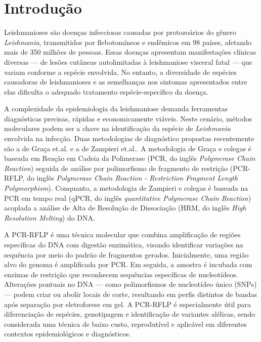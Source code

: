 \section{Introdução}

Leishmanioses são doenças infecciosas causadas por protozoários do gênero
\textit{Leishmania}, transmitidos por flebotomíneos e endêmicos em 98 países,
afetando mais de 350 milhões de pessoas\cite{hong2020one}. Essas doenças
apresentam manifestações clínicas diversas — de lesões cutâneas autolimitadas à
leishmaniose visceral fatal — que variam conforme a espécie envolvida. No
entanto, a diversidade de espécies causadoras de leishmanioses e as semelhanças
nos sintomas apresentados entre elas dificulta o adequado tratamento
espécie-específico da doença.

A complexidade da epidemiologia da leishmaniose demanda ferramentas diagnósticas
precisas, rápidas e economicamente viáveis.  Neste cenário, métodos moleculares
podem ser a chave na identificação da espécie de \textit{Leishmania} envolvida
na infecção. Duas metodologias de diagnóstico propostas recentemente são a de
Graça et.al.\cite{RFLPgraca2012} e a de Zampieri et.al.\cite{HRMzampi2016}.  A
metodologia de Graça e colegas é baseada em Reação em Cadeia da Polimerase (PCR,
do inglês \textit{Polymerase Chain Reaction}) seguida de análise por
polimorfismo de fragmento de restrição (PCR-RFLP, do inglês \textit{Polymerase
Chain Reaction - Restriction Fragment Length Polymorphism}). Conquanto, a
metodologia de Zampieri e colegas é baseada na PCR em tempo real (qPCR, do
inglês \textit{quantitative Polymerase Chain Reaction}) acoplada a análise de
Alta de Resolução de Dissociação (HRM, do inglês \textit{High Resolution
Melting}) do DNA. 

A PCR-RFLP é uma técnica molecular que combina amplificação de regiões
específicas do DNA com digestão enzimática, visando identificar variações na
sequência por meio do padrão de fragmentos gerados. Inicialmente, uma região
alvo do genoma é amplificada por PCR. Em seguida, a amostra é incubada com
enzimas de restrição que reconhecem sequências específicas de nucleotídeos.
Alterações pontuais no DNA — como polimorfismos de nucleotídeo único (SNPs) —
podem criar ou abolir locais de corte, resultando em perfis distintos de bandas
após separação por eletroforese em gel. A PCR-RFLP é especialmente útil para
diferenciação de espécies, genotipagem e identificação de variantes alélicas,
sendo considerada uma técnica de baixo custo, reprodutível e aplicável em
diferentes contextos epidemiológicos e diagnósticos\cite{garcia2005metodos}.


